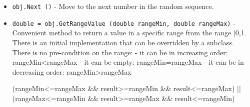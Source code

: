 \begin{itemize}
\item  \verb|obj.Next ()| -  Move to the next number in the random sequence.

\item  \verb|double = obj.GetRangeValue (double rangeMin, double rangeMax)| -  Convenient method to return a value in a specific range from the
 range [0,1. There is an initial implementation that can be overridden
 by a subclass.
 There is no pre-condition on the range:
 - it can be in increasing order: rangeMin<rangeMax
 - it can be empty: rangeMin=rangeMax
 - it can be in decreasing order: rangeMin>rangeMax
 
 (rangeMin<=rangeMax \&\& result>=rangeMin \&\& result<=rangeMax)
 || (rangeMax<=rangeMin \&\& result>=rangeMax \&\& result<=rangeMin)

\end{itemize}
